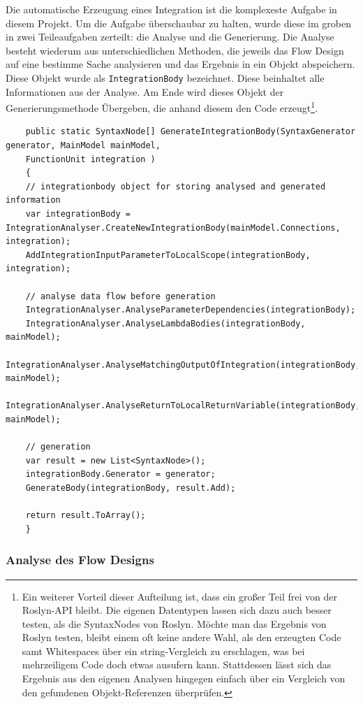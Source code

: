 	
	Die automatische Erzeugung eines Integration ist die komplexeste Aufgabe in
	diesem Projekt. Um die Aufgabe überschaubar zu halten, wurde diese im groben in
	zwei Teileaufgaben zerteilt: die Analyse und die Generierung.
	Die Analyse besteht wiederum aus unterschiedlichen Methoden, die jeweils das
	Flow Design auf eine bestimme Sache analysieren und das Ergebnis in ein Objekt
	abspeichern. Diese Objekt wurde als \texttt{IntegrationBody} bezeichnet.
	Diese beinhaltet alle Informationen aus der Analyse. Am Ende wird dieses Objekt
	der Generierungsmethode Übergeben, die anhand diesem den Code erzeugt\footnote{Ein weiterer Vorteil dieser Aufteilung ist, dass ein großer Teil frei von der Roslyn-API bleibt. Die eigenen Datentypen lassen sich dazu auch besser testen, als die SyntaxNodes von Roslyn. Möchte man das Ergebnis von Roslyn testen, bleibt einem  oft keine andere Wahl, als den erzeugten Code samt Whitespaces über ein string-Vergleich zu erschlagen, was bei mehrzeiligem Code doch etwas ausufern kann. Stattdessen lässt sich das Ergebnis aus den eigenen Analysen hingegen einfach über ein Vergleich von den gefundenen Objekt-Referenzen überprüfen.}.
	
	\begin{verbatim}
	public static SyntaxNode[] GenerateIntegrationBody(SyntaxGenerator generator, MainModel mainModel,
	FunctionUnit integration )
	{
	// integrationbody object for storing analysed and generated information
	var integrationBody = IntegrationAnalyser.CreateNewIntegrationBody(mainModel.Connections, integration);
	AddIntegrationInputParameterToLocalScope(integrationBody, integration);
	
	// analyse data flow before generation 
	IntegrationAnalyser.AnalyseParameterDependencies(integrationBody);
	IntegrationAnalyser.AnalyseLambdaBodies(integrationBody, mainModel);
	IntegrationAnalyser.AnalyseMatchingOutputOfIntegration(integrationBody, mainModel);
	IntegrationAnalyser.AnalyseReturnToLocalReturnVariable(integrationBody, mainModel);
	
	// generation
	var result = new List<SyntaxNode>();
	integrationBody.Generator = generator;
	GenerateBody(integrationBody, result.Add);
	
	return result.ToArray();
	}
	\end{verbatim}
	
	\subsubsection{Analyse des Flow Designs}

